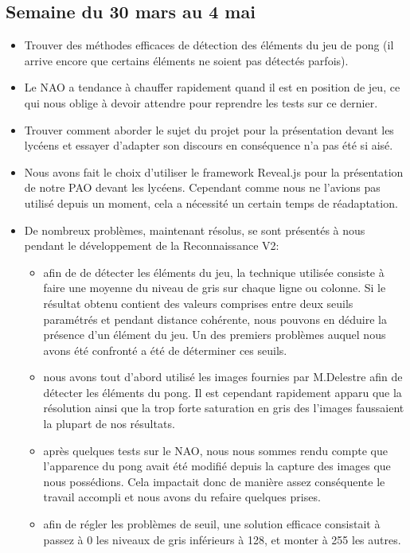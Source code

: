  \subsection{Semaine du 30 mars au 4 mai}
  \label{sub:Semaine du 30 mars au 4 mai}
    \begin{itemize}
      \item Trouver des méthodes efficaces de détection des éléments du jeu de pong (il arrive encore que certains éléments ne soient pas détectés parfois).
      \item Le NAO a tendance à chauffer rapidement quand il est en position de jeu, ce qui nous oblige à devoir attendre pour reprendre les tests sur ce dernier.
      \item Trouver comment aborder le sujet du projet pour la présentation devant les lycéens et essayer d’adapter son discours en conséquence n’a pas été si aisé.
      \item Nous avons fait le choix d’utiliser le framework Reveal.js pour la présentation de notre PAO devant les lycéens.
      Cependant comme nous ne l’avions pas utilisé depuis un moment, cela a nécessité un certain temps de réadaptation.
      \item De nombreux problèmes, maintenant résolus, se sont présentés à nous pendant le développement de la Reconnaissance V2:
            \begin{itemize}
              \item afin de de détecter les éléments du jeu, la technique utilisée consiste à faire une moyenne du niveau de gris sur chaque ligne ou colonne.
              Si le résultat obtenu contient des valeurs comprises entre deux seuils paramétrés et pendant distance cohérente, nous pouvons en déduire la présence d’un élément du jeu.
              Un des premiers problèmes auquel nous avons été confronté a été de déterminer ces seuils.
              \item nous avons tout d’abord utilisé les images fournies par M.Delestre afin de détecter les éléments du pong.
              Il est cependant rapidement apparu que la résolution ainsi que la trop forte saturation en gris des l’images faussaient la plupart de nos résultats.
              \item après quelques tests sur le NAO, nous nous sommes rendu compte que l’apparence du pong avait été modifié depuis la capture des images que nous possédions.
              Cela impactait donc de manière assez conséquente le travail accompli et nous avons du refaire quelques prises.
              \item afin de régler les problèmes de seuil, une solution efficace consistait à passez à 0 les niveaux de gris inférieurs à 128, et monter à 255 les autres.

\end{itemize}
\end{itemize}
